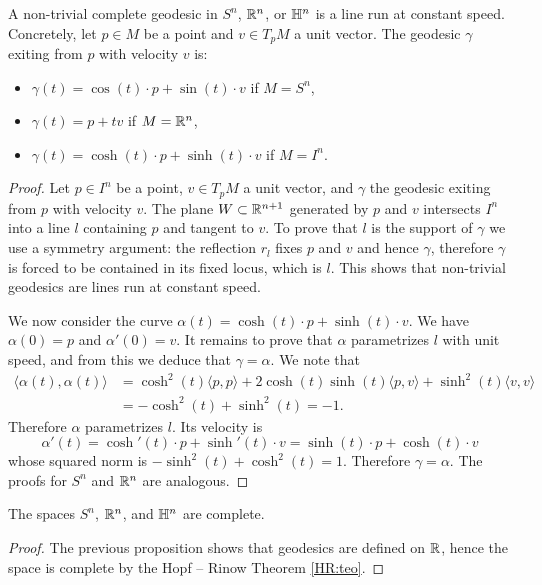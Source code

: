 \begin{prop} \label{lines:prop}
A non-trivial complete geodesic in $S^n$, $\mathbb{R}^n$, or $\mathbb{H}^n$ is a line run at constant speed. Concretely, let $p\in M$ be a point and $v\in T_pM$ a unit vector. The geodesic $\gamma$ exiting from $p$ with velocity $v$ is:
\begin{itemize}
\item $\gamma(t) = \cos (t) \cdot p + \sin (t) \cdot v$ if $M=S^n$,
\item $\gamma(t) = p + tv$ if $M=\mathbb{R}^n$,
\item $\gamma(t) = \cosh (t) \cdot p + \sinh (t) \cdot v$ if $M=I^n$.
\end{itemize}
\end{prop}
\begin{proof}
Let $p\in I^n$ be a point, $v\in T_pM$ a unit vector, and $\gamma$ the geodesic exiting from $p$ with velocity $v$.
The plane $W\subset \mathbb{R}^{n+1}$ generated by $p$ and $v$ intersects $I^n$ into a line $l$ containing $p$ and tangent to $v$. To prove that $l$ is the support of $\gamma$ we use a symmetry argument: the reflection $r_l$ fixes $p$ and $v$ and hence $\gamma$, therefore $\gamma$ is forced to be contained in its fixed locus, which is $l$. This shows that non-trivial geodesics are lines run at constant speed.

We now consider the curve $\alpha(t) = \cosh (t) \cdot p + \sinh(t) \cdot v$. We have $\alpha(0) = p$ and $\alpha'(0) = v$. It remains to prove that $\alpha$ parametrizes $l$ with unit speed, and from this we deduce that $\gamma = \alpha$. We note that 
\begin{align*}
\langle \alpha (t), \alpha(t) \rangle & = \cosh^2(t) \langle p,p \rangle + 2\cosh(t)\sinh(t) \langle p,v \rangle + \sinh^2(t) \langle v,v\rangle \\
 & = -\cosh^2(t) + \sinh^2(t) = -1.
 \end{align*}
Therefore $\alpha$ parametrizes $l$. Its velocity is 
$$\alpha'(t) = \cosh'(t)\cdot p + \sinh'(t)\cdot v = \sinh(t)\cdot p + \cosh(t) \cdot v$$
whose squared norm is $-\sinh^2(t) + \cosh^2(t) = 1$. Therefore $\gamma=\alpha$. The proofs for $S^n$ and $\mathbb{R}^n$ are analogous.
\end{proof}

\begin{cor}
The spaces $S^n$, $\mathbb{R}^n$, and $\mathbb{H}^n$ are complete.
\end{cor}
\begin{proof}
The previous proposition shows that geodesics are defined on $\mathbb{R}$, hence the space is complete by the Hopf -- Rinow Theorem \ref{HR:teo}.
\end{proof}

